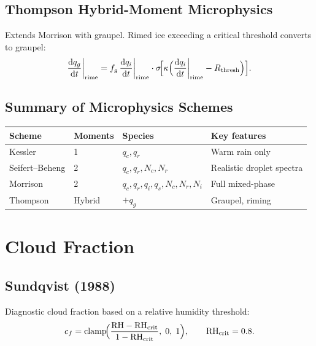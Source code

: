 \documentclass[11pt,twoside]{report}
\newcommand{\dd}{\mathrm{d}}
\begin{document}
\subsection{Thompson Hybrid-Moment Microphysics}

Extends Morrison with graupel.  Rimed ice exceeding a critical threshold
converts to graupel:
\begin{equation}
  \frac{\dd q_g}{\dd t}\bigg|_{\mathrm{rime}}
  = f_g\,\frac{\dd q_i}{\dd t}\bigg|_{\mathrm{rime}}
  \cdot\sigma\!\Bigl[\kappa\Bigl(\frac{\dd q_i}{\dd t}\bigg|_{\mathrm{rime}}
  - R_{\mathrm{thresh}}\Bigr)\Bigr].
\end{equation}

\subsection{Summary of Microphysics Schemes}

\begin{center}
\begin{tabular}{lllp{5cm}}
\toprule
Scheme & Moments & Species & Key features \\
\midrule
Kessler & 1 & $q_c,q_r$ & Warm rain only \\
Seifert--Beheng & 2 & $q_c,q_r,N_c,N_r$ & Realistic droplet spectra \\
Morrison & 2 & $q_c,q_r,q_i,q_s,N_c,N_r,N_i$ & Full mixed-phase \\
Thompson & Hybrid & $+q_g$ & Graupel, riming \\
\bottomrule
\end{tabular}
\end{center}


\section{Cloud Fraction}
\label{sec:clouds}

\subsection{Sundqvist (1988)}

Diagnostic cloud fraction based on a relative humidity threshold:
\begin{equation}
  c_f = \mathrm{clamp}\!\Bigl(\frac{\mathrm{RH}-\mathrm{RH}_{\mathrm{crit}}}
  {1-\mathrm{RH}_{\mathrm{crit}}},\;0,\;1\Bigr),
  \qquad \mathrm{RH}_{\mathrm{crit}}=0.8.
\end{equation}
\end{document}
